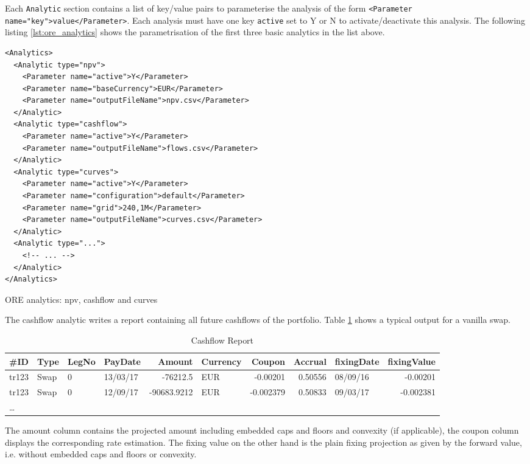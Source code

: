 \documentclass[12pt, a4paper]{article}
\begin{document}
Each {\tt Analytic} section contains a list of key/value pairs to parameterise the analysis of the form {\tt <Parameter
  name="key">value</Parameter>}. Each analysis must have one key {\tt active} set to Y or N to activate/deactivate this
analysis.  The following listing \ref{lst:ore_analytics} shows the parametrisation of the first three basic analytics in
the list above.

\begin{listing}[H]
\begin{verbatim}
<Analytics>    
  <Analytic type="npv">
    <Parameter name="active">Y</Parameter>
    <Parameter name="baseCurrency">EUR</Parameter>
    <Parameter name="outputFileName">npv.csv</Parameter>
  </Analytic>      
  <Analytic type="cashflow">
    <Parameter name="active">Y</Parameter>
    <Parameter name="outputFileName">flows.csv</Parameter>
  </Analytic>      
  <Analytic type="curves">
    <Parameter name="active">Y</Parameter>
    <Parameter name="configuration">default</Parameter>
    <Parameter name="grid">240,1M</Parameter>
    <Parameter name="outputFileName">curves.csv</Parameter>
  </Analytic>
  <Analytic type="...">
    <!-- ... -->
  </Analytic>      
</Analytics>      
\end{verbatim}
\caption{ORE analytics: npv, cashflow and curves}
\label{lst:ore_analytics}
\end{listing}

The cashflow analytic writes a report containing all future cashflows of the portfolio. Table \ref{cashflowreport} shows
a typical output for a vanilla swap.

\begin{table}[hbt]
\scriptsize
\begin{center}
  \begin{tabular}{l|l|l|l|r|l|r|r|l|r}
\hline
\#ID & Type & LegNo & PayDate & Amount & Currency & Coupon & Accrual & fixingDate & fixingValue \\
\hline
\hline
tr123 & Swap & 0 & 13/03/17 & -76212.5 & EUR & -0.00201 & 0.50556 & 08/09/16 & -0.00201 \\
tr123 & Swap & 0 & 12/09/17 & -90683.9212 & EUR & -0.002379 & 0.50833 & 09/03/17 & -0.002381 \\
\ldots
\end{tabular}
\caption{Cashflow Report}
\label{cashflowreport}
\end{center}
\end{table}

The amount column contains the projected amount including embedded caps and floors and convexity (if applicable), the
coupon column displays the corresponding rate estimation. The fixing value on the other hand is the plain fixing
projection as given by the forward value, i.e. without embedded caps and floors or convexity.
\end{document}

